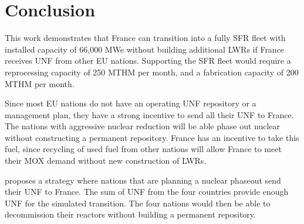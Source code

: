 \section{Conclusion}

This work demonstrates that France can transition into
a fully \gls{SFR} fleet with installed capacity of 66,000 MWe without
building additional \glspl{LWR}
if France receives \gls{UNF} from other \gls{EU} nations.
Supporting the \gls{SFR} fleet would require a reprocessing capacity of 250 MTHM per month,
and a fabrication capacity of 200 MTHM per month.


Since most \gls{EU} nations do not have an operating \gls{UNF}
repository or a management plan, they have a strong incentive
to send all their \gls{UNF} to France. The nations
with aggressive nuclear reduction will be able phase out nuclear
without constructing a permanent repository. France has an
incentive to take this fuel, since recycling of used fuel from
other nations will allow France to meet their MOX demand
without new construction of \glspl{LWR}.

 proposes a strategy where nations
that are planning a nuclear phaseout send their \gls{UNF}
to France. The sum of \gls{UNF} from the four countries
provide enough \gls{UNF} for the simulated transition.
The four nations would then be able to decommission
their reactors without building a permanent repository. 

